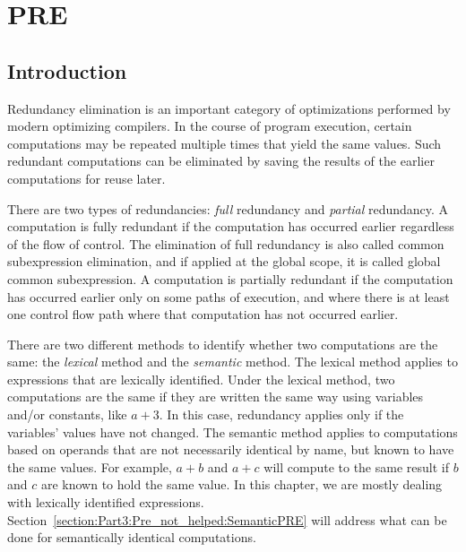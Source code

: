 \chapter{PRE }
\graphicspath{{img/}{pre_not_helped/img/}{part3/pre_not_helped/img/}}

\section{Introduction}

Redundancy elimination is an 
important category of optimizations performed by modern optimizing compilers.
In the course of program execution, certain computations may be repeated
multiple times that yield the same values.  Such redundant
computations can be eliminated by saving the results of the earlier 
computations for reuse later.  

There are two types of redundancies: \emph{full} redundancy and 
\emph{partial} redundancy.  A computation is fully redundant if the 
computation has occurred earlier regardless of the flow of control.
The elimination of full redundancy is also called common subexpression
elimination, and if applied at the global scope, it is called global common
subexpression.  A computation is partially redundant if the computation has
occurred earlier only on some paths of execution, and where there is at
least one control flow path where that computation has not occurred earlier.

There are two different methods to identify whether two computations are the 
same: the \emph{lexical} method and the \emph{semantic} method.  The 
lexical method applies to expressions that are lexically identified.
Under the lexical method, two computations are the same if they
are written the same way using variables and/or constants, like 
$a+3$.  In this case,
redundancy applies only if the variables' values have not changed.
The semantic method applies to computations based on operands that are
not necessarily identical by name, but known to have the same values.
For example, $a+b$ and $a+c$ will compute to the same result
if $b$ and $c$ are known to hold the same value.
In this chapter, we are mostly dealing with lexically identified
expressions.  Section~\ref{section:Part3:Pre_not_helped:SemanticPRE} will
address what can be done for semantically identical computations. 

